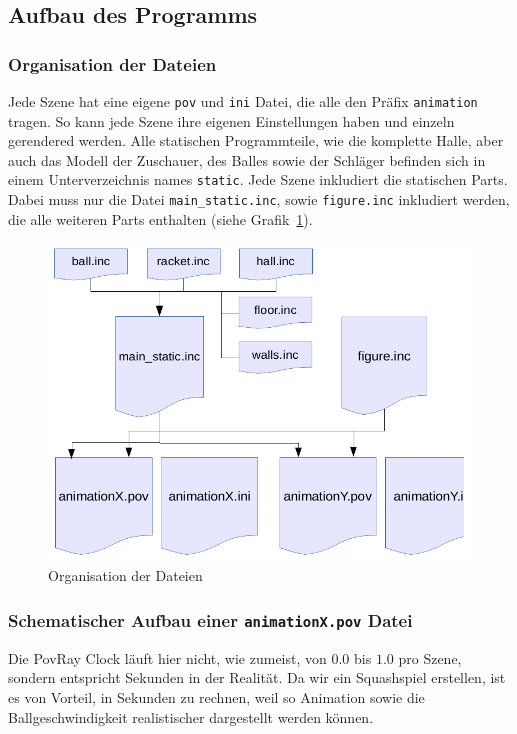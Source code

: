\subsection{Aufbau des Programms}
\subsubsection{Organisation der Dateien}
Jede Szene hat eine eigene \texttt{pov} und \texttt{ini} Datei, die alle den Präfix \texttt{animation} tragen. So kann jede Szene ihre eigenen Einstellungen haben und einzeln gerendered werden. Alle statischen Programmteile, wie die komplette Halle, aber auch das Modell der Zuschauer, des Balles sowie der Schläger befinden sich in einem Unterverzeichnis names \texttt{static}. Jede Szene inkludiert die statischen Parts. Dabei muss nur die Datei \texttt{main\_static.inc}, sowie \texttt{figure.inc} inkludiert werden, die alle weiteren Parts enthalten (siehe Grafik~\ref{fig:aufbau}).
\begin{figure}[h!]
	\centering
	\includegraphics[width=.9\linewidth]{images/aufbau_grafisch.png}
	\caption{Organisation der Dateien}\label{fig:aufbau}
\end{figure}

\subsubsection{Schematischer Aufbau einer \texttt{animationX.pov} Datei}
Die PovRay Clock läuft hier nicht, wie zumeist, von $0.0$ bis $1.0$ pro Szene, sondern entspricht Sekunden in der Realität. Da wir ein Squashspiel erstellen, ist es von Vorteil, in Sekunden zu rechnen, weil so Animation sowie die Ballgeschwindigkeit realistischer dargestellt werden können. 

